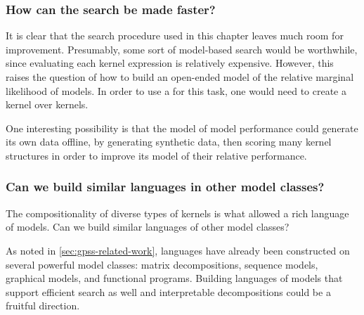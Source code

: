 \subsubsection{How can the search be made faster?}
It is clear that the search procedure used in this chapter leaves much room for improvement.
Presumably, some sort of model-based search would be worthwhile, since evaluating each kernel expression is relatively expensive.
However, this raises the question of how to build an open-ended model of the relative marginal likelihood of \gp{} models.
In order to use a \gp{} for this task, one would need to create a kernel over kernels.

One interesting possibility is that the model of model performance could generate its own data offline, by generating synthetic data, then scoring many kernel structures in order to improve its model of their relative performance.

\subsubsection{Can we build similar languages in other model classes?}
The compositionality of diverse types of kernels is what allowed a rich language of \gp{} models.
Can we build similar languages of other model classes?

As noted in \cref{sec:gpss-related-work}, languages have already been constructed on several powerful model classes: matrix decompositions, sequence models, graphical models, and functional programs.
Building languages of models that support efficient search as well and interpretable decompositions could be a fruitful direction.


\outbpdocument{


}





\iffalse


